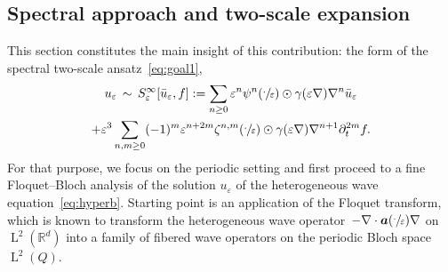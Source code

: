 \documentclass[10pt]{amsart}
\theoremstyle{plain}
\theoremstyle{definition}
\numberwithin{equation}{section}
\newcommand{\e}{\varepsilon}
\newcommand{\R}{\mathbb R}
\newcommand{\Aa}{\boldsymbol a}
\newcommand{\Ld}{\operatorname{L}}
\begin{document}
\subsection{Spectral approach and two-scale expansion}\label{sec:Bloch}
This section constitutes the main insight of this contribution: the form of the spectral two-scale ansatz~\eqref{eq:goal1},
\begin{multline}\label{eq:spectral-Ansatz}
u_\e\,\sim\,S^\infty_\e[\bar u_\e,f]:=\sum_{n\ge0}\e^n\psi^n(\sfrac\cdot\e)\odot\gamma(\e\nabla)\nabla^n\bar u_\e\\
+\e^3\sum_{n,m\ge0}(-1)^m\e^{n+2m}\zeta^{n,m}(\sfrac\cdot\e)\odot\gamma(\e\nabla)\nabla^{n+1}\partial_t^{2m}f.
\end{multline}
For that purpose, we focus on the periodic setting and first proceed to a fine Floquet--Bloch analysis of the solution $u_\e$ of the heterogeneous wave equation~\eqref{eq:hyperb}.
Starting point is an application of the Floquet transform, which is known to transform the heterogeneous wave operator~\mbox{$-\nabla\cdot\Aa(\sfrac\cdot\e)\nabla$} on $\Ld^2(\R^d)$ into a family of fibered wave operators on the periodic Bloch space $\Ld^2(Q)$.
\end{document}
